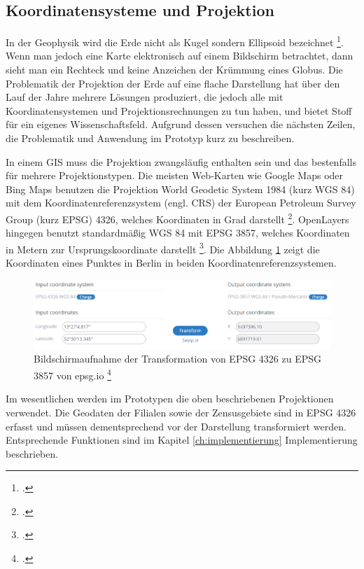 \subsection{Koordinatensysteme und Projektion}
In der Geophysik wird die Erde nicht als Kugel sondern Ellipsoid bezeichnet \footcite{jung_figur_1956}.
Wenn man jedoch eine Karte elektronisch auf einem Bildschirm betrachtet, dann sieht man ein Rechteck und keine Anzeichen der Krümmung eines Globus.
Die Problematik der Projektion der Erde auf eine flache Darstellung hat über den Lauf der Jahre mehrere Lösungen produziert, die jedoch alle mit Koordinatensystemen und Projektionsrechnungen zu tun haben, und bietet Stoff für ein eigenes Wissenschaftsfeld.
Aufgrund dessen versuchen die nächsten Zeilen, die Problematik und Anwendung im Prototyp kurz zu beschreiben.

In einem GIS muss die Projektion zwangsläufig enthalten sein und das bestenfalls für mehrere Projektionstypen.
Die meisten Web-Karten wie Google Maps oder Bing Maps benutzen die Projektion World Geodetic System 1984 (kurz WGS 84) mit dem Koordinatenreferenzsystem (engl. CRS) der European Petroleum Survey Group (kurz EPSG) 4326, welches Koordinaten in Grad darstellt \footcite{epsg.io_4326}.
OpenLayers hingegen benutzt standardmäßig WGS 84 mit EPSG 3857, welches Koordinaten in Metern zur Ursprungskoordinate darstellt \footcite{epsg.io_3857}.
Die Abbildung \ref{img:epsg.io} zeigt die Koordinaten eines Punktes in Berlin in beiden Koordinatenreferenzsystemen.

\begin{figure}[H]
	\centering
	\includegraphics[scale=0.6]{resources/images/projection_epsg.png}
	\caption{Bildschirmaufnahme der Transformation  von EPSG 4326 zu EPSG 3857 von epsg.io \footcite{epsg.io_transform}}
	\label{img:epsg.io}
\end{figure}

Im wesentlichen werden im Prototypen die oben beschriebenen Projektionen verwendet.
Die Geodaten der Filialen sowie der Zensusgebiete sind in EPSG 4326 erfasst und müssen dementsprechend vor der Darstellung transformiert werden.
Entsprechende Funktionen sind im Kapitel \ref{ch:implementierung} Implementierung beschrieben.

